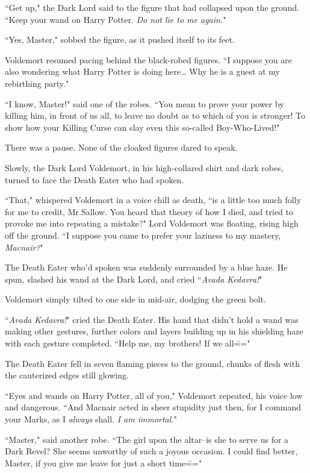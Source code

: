 ``Get up," the Dark Lord said to the figure that had collapsed upon the ground. ``Keep your wand on Harry Potter. \emph{Do not lie to me again.}"

``Yes, Master," sobbed the figure, as it pushed itself to its feet.

Voldemort resumed pacing behind the black-robed figures. ``I suppose you are also wondering what Harry Potter is doing here{\ldots} Why he is a guest at my rebirthing party."

``I know, Master!" said one of the robes. ``You mean to prove your power by killing him, in front of us all, to leave no doubt as to which of you is stronger! To show how your Killing Curse can slay even this so-called Boy-Who-Lived!"

There was a pause. None of the cloaked figures dared to speak.

Slowly, the Dark Lord Voldemort, in his high-collared shirt and dark robes, turned to face the Death Eater who had spoken.

``That," whispered Voldemort in a voice chill as death, ``is a little too much folly for me to credit, Mr.\?Sallow. You heard that theory of how I died, and tried to provoke me into repeating a mistake?" Lord Voldemort was floating, rising high off the ground. ``I suppose you came to prefer your laziness to my mastery, \emph{Macnair?}"

The Death Eater who'd spoken was suddenly surrounded by a blue haze. He spun, slashed his wand at the Dark Lord, and cried ``\emph{Avada Kedavra!}"

Voldemort simply tilted to one side in mid-air, dodging the green bolt.

``\emph{Avada Kedavra!}" cried the Death Eater. His hand that didn't hold a wand was making other gestures, further colors and layers building up in his shielding haze with each gesture completed. ``Help me, my brothers! If we all\==="

The Death Eater fell in seven flaming pieces to the ground, chunks of flesh with the cauterized edges still glowing.

``Eyes and wands on Harry Potter, all of you," Voldemort repeated, his voice low and dangerous. ``And Macnair acted in sheer stupidity just then, for I command your Marks, as I \emph{always} shall. \emph{I am immortal.}"

``Master," said another robe. ``The girl upon the altar\---is she to serve us for a Dark Revel? She seems unworthy of such a joyous occasion. I could find better, Master, if you give me leave for just a short time\==="

